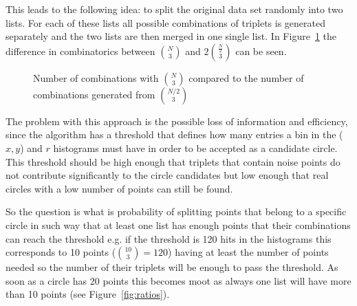 \documentclass[11pt,twoside]{scrreprt}
\begin{document}
This leads to the following idea: to split the original data set randomly into two lists. For each of these lists all possible combinations 
of triplets is generated separately and the two lists are then merged in one single list. In Figure~\ref{fig:binom_half_growth} 
the difference in combinatorics between $\binom{N}{3}$ and $2\binom{\frac{N}{2}}{3}$ can be seen.

\begin{figure}[b]
\centering
  \caption{Number of combinations with $\binom{N}{3}$ compared to the number of combinations generated from $\binom{N/2}{3}$}
  \label{fig:binom_half_growth}
\end{figure}

The problem with this approach is the possible loss of information and efficiency, since the
algorithm has a threshold that defines how many entries a bin in the ($x,y$) and $r$ histograms must 
have in order to be accepted as a candidate circle.
This threshold should be high enough that triplets that contain noise points
do not contribute significantly to the circle candidates but low enough that real circles with a
low number of points can still be found.

So the question is what is probability of splitting points that belong to a specific circle in such way that at least one list
has enough points that their combinations can reach the threshold e.g. if the threshold is 120 hits in the histograms this corresponds
to 10 points ($\binom{10}{3} = 120$)
having at least the number of points needed so the number of their triplets will be enough
to pass the threshold. As soon as a circle has 20 points this becomes moot as always one list will have more 
than 10 points (see Figure~\ref{fig:ratios}).
\end{document}
